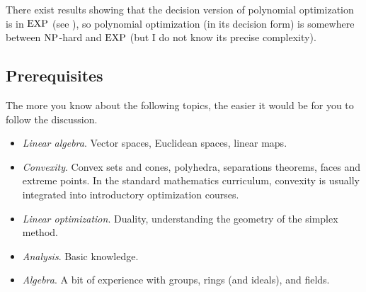 There exist results showing that the decision version of polynomial optimization is in $\operatorname{EXP}$ (see \cite{MR3212780}), so polynomial optimization (in its decision form) is somewhere between $\operatorname{NP}$-hard and $\operatorname{EXP}$ (but I do not know its precise complexity). 




\subsection{Prerequisites}

The more you know about the following topics, the easier it would be for you to follow the discussion. 

\begin{itemize}
	\item[] \emph{Linear algebra}. Vector spaces, Euclidean spaces, linear maps. 
	\item[] \emph{Convexity}. Convex sets and cones, polyhedra, separations theorems, faces and extreme points. In the standard mathematics curriculum, convexity is usually integrated into introductory optimization courses.
	\item[] \emph{Linear optimization}. Duality, understanding the geometry of the simplex method. 
	\item[] \emph{Analysis}. Basic knowledge. 
	\item[] \emph{Algebra}. A bit of experience with groups, rings (and ideals), and fields. 
\end{itemize}


